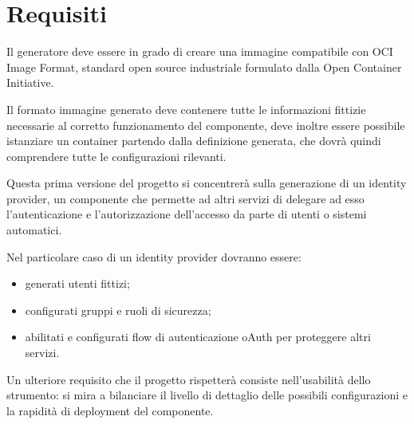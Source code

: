 \section{Requisiti}

Il generatore deve essere in grado di creare una immagine compatibile con OCI Image Format, standard open source industriale formulato dalla Open Container Initiative.

Il formato immagine generato deve contenere tutte le informazioni fittizie necessarie al corretto funzionamento del componente, deve inoltre essere possibile istanziare un container partendo dalla definizione generata, che dovrà quindi comprendere tutte le configurazioni rilevanti. 

Questa prima versione del progetto si concentrerà sulla generazione di un identity provider, un componente che permette ad altri servizi di delegare ad esso l'autenticazione e l'autorizzazione dell'accesso da parte di utenti o sistemi automatici.

Nel particolare caso di un identity provider dovranno essere:
\begin{itemize}
    \item generati utenti fittizi;
    \item configurati gruppi e ruoli di sicurezza;
    \item abilitati e configurati flow di autenticazione oAuth per proteggere altri servizi.
\end{itemize}

Un ulteriore requisito che il progetto rispetterà consiste nell'usabilità dello strumento: si mira a bilanciare il livello di dettaglio delle possibili configurazioni e la rapidità di deployment del componente.
